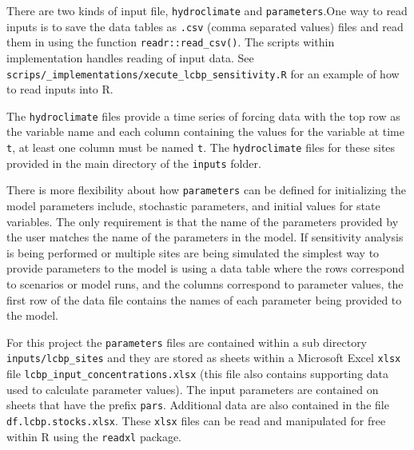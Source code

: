 \documentclass[
]{article}
\begin{document}
There are two kinds of input file, \texttt{hydroclimate} and
\texttt{parameters}.One way to read inputs is to save the data tables as
\texttt{.csv} (comma separated values) files and read them in using the
function \texttt{readr::read\_csv()}. The scripts within implementation
handles reading of input data. See
\texttt{scrips/\_implementations/xecute\_lcbp\_sensitivity.R} for an
example of how to read inputs into R.

The \texttt{hydroclimate} files provide a time series of forcing data
with the top row as the variable name and each column containing the
values for the variable at time \texttt{t}, at least one column must be
named \texttt{t}. The \texttt{hydroclimate} files for these sites
provided in the main directory of the \texttt{inputs} folder.

There is more flexibility about how \texttt{parameters} can be defined
for initializing the model parameters include, stochastic parameters,
and initial values for state variables. The only requirement is that the
name of the parameters provided by the user matches the name of the
parameters in the model. If sensitivity analysis is being performed or
multiple sites are being simulated the simplest way to provide
parameters to the model is using a data table where the rows correspond
to scenarios or model runs, and the columns correspond to parameter
values, the first row of the data file contains the names of each
parameter being provided to the model.

For this project the \texttt{parameters} files are contained within a
sub directory \texttt{inputs/lcbp\_sites} and they are stored as sheets
within a Microsoft Excel \texttt{xlsx} file
\texttt{lcbp\_input\_concentrations.xlsx} (this file also contains
supporting data used to calculate parameter values). The input
parameters are contained on sheets that have the prefix \texttt{pars}.
Additional data are also contained in the file
\texttt{df.lcbp.stocks.xlsx}. These \texttt{xlsx} files can be read and
manipulated for free within R using the \texttt{readxl} package.
\end{document}
